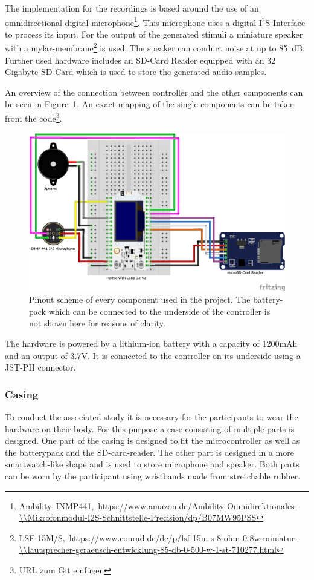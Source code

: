 The implementation for the recordings is based around the use of an omnidirectional digital microphone\footnote{Ambility~INMP441,~\url{https://www.amazon.de/Ambility-Omnidirektionales-\\Mikrofonmodul-I2S-Schnittstelle-Precision/dp/B07MW95PSS}}.
This microphone uses a digital I$^{2}$S-Interface to process its input. 
For the output of the generated stimuli a miniature speaker with a mylar-membrane\footnote{LSF-15M/S,~\url{https://www.conrad.de/de/p/lsf-15m-s-8-ohm-0-8w-miniatur-\\lautsprecher-geraeusch-entwicklung-85-db-0-500-w-1-st-710277.html}} is used.
The speaker can conduct noise at up to 85~dB.
Further used hardware includes an SD-Card Reader equipped with an 32 Gigabyte SD-Card which is used to store the generated audio-samples.

An overview of the connection between controller and the other components can be seen in Figure~\ref{fig:pinout}.
An exact mapping of the single components can be taken from the code\footnote{URL zum Git einfügen}.
\begin{figure}[H]
	\includegraphics[width=\linewidth]{Media/Hardware_Pinout.png}
	\caption{Pinout scheme of every component used in the project. The battery-pack which can be connected to the underside of the controller is not shown here for reasons of clarity.}
	\label{fig:pinout}
\end{figure}
The hardware is powered by a lithium-ion battery with a capacity of 1200mAh and an output of 3.7V.
It is connected to the controller on its underside using a JST-PH connector. 

\subsubsection{Casing}
To conduct the associated study it is necessary for the participants to wear the hardware on their body.
For this purpose a case consisting of multiple parts is designed.
One part of the casing is designed to fit the microcontroller as well as the batterypack and the SD-card-reader.
The other part is designed in a more smartwatch-like shape and is used to store microphone and speaker. 
Both parts can be worn by the participant using wristbands made from stretchable rubber.

